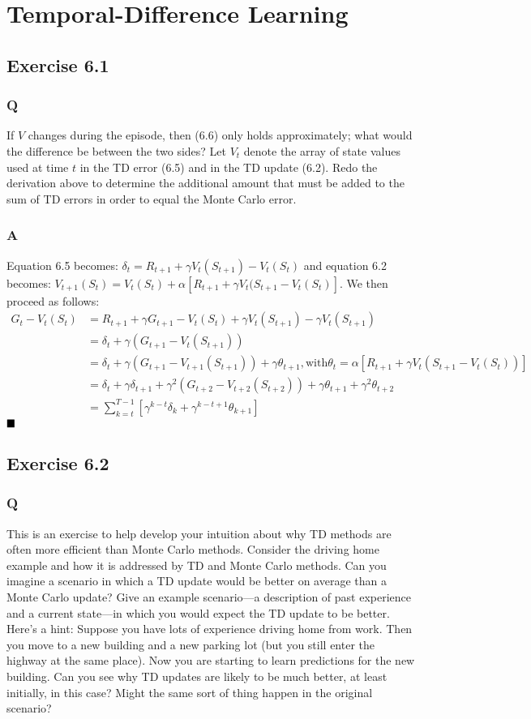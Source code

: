\section{Temporal-Difference Learning}
\subsection{Exercise 6.1}
\subsubsection{Q}
If $V$ changes during the episode, then (6.6) only holds approximately; what would the difference be between the two sides? Let $V_t$ denote the array of state values
used at time $t$ in the TD error (6.5) and in the TD update (6.2). Redo the derivation above to determine the additional amount that must be added to the sum of TD errors in order to equal the Monte Carlo error.
\subsubsection{A}
Equation 6.5 becomes: $\delta_t = R_{t+1} + \gamma V_t(S_{t+1}) - V_t(S_t)$ and equation 6.2 becomes: $V_{t+1}(S_t) = V_t(S_t) + \alpha \left[R_{t+1} + \gamma V_t(S_{t+1} - V_t(S_t)\right]$. We then proceed as follows:
\begin{align}
G_t - V_t(S_t) &= R_{t+1} + \gamma G_{t+1} - V_t(S_t) + \gamma V_t(S_{t+1}) - \gamma V_t(S_{t+1}) \\
&= \delta_t + \gamma(G_{t+1} - V_t(S_{t+1})) \\
&= \delta_t + \gamma(G_{t+1} - V_{t+1}(S_{t+1})) + \gamma \theta_{t+1}, \text{with} \theta_{t} = \alpha \left[R_{t+1} + \gamma V_t(S_{t+1} - V_t(S_t))\right] \\
&= \delta_t + \gamma \delta_{t+1} + \gamma^2(G_{t+2} - V_{t+2}(S_{t+2})) + \gamma \theta_{t+1} + \gamma^2 \theta_{t+2} \\
&= \sum_{k=t}^{T-1} \left[\gamma^{k-t} \delta_k + \gamma^{k-t+1} \theta_{k+1}\right]
\end{align}
$
\hfill \blacksquare
$

\subsection{Exercise 6.2}
\subsubsection{Q}
This is an exercise to help develop your intuition about why TD methods are often more efficient than Monte Carlo methods. Consider the driving home example and how it is addressed by TD and Monte Carlo methods. Can you imagine a scenario in which a TD update would be better on average than a Monte Carlo update? Give an example scenario—a description of past experience and a current state—in which you would expect the TD update to be better. Here’s a hint: Suppose you have lots of experience driving home from work. Then you move to a new building and a new parking lot (but you still enter the highway at the same place). Now you are starting to learn predictions for the new building. Can you see why TD updates are likely to be much better, at least initially, in this case? Might the same sort of thing happen in the original scenario?

